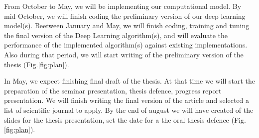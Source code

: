 \documentclass[12pt]{article}
\begin{document}
From October to May, we will be implementing our computational model. By mid October, we will finish coding the preliminary version of our deep learning model(s). Beetween January and May, we will finish coding, training and tuning the final version of the Deep Learning algorithm(s), and will evaluate the performance of the implemented algorithm(s) against existing implementations. Also during that period, we will start writing of the preliminary version of the thesis (Fig.\ref{fig:plan}).

In May, we expect finishing final draft of the thesis. At that time we will start the preparation of the seminar presentation, thesis defence, progress report presentation. We will finish writing the final version of the article and selected a list of scientific journal to apply. By the end of august we will have created of the slides for the thesis presentation, set the date for a the oral thesis defence (Fig.\ref{fig:plan}). 

\printbibliography[title={Bibliography},nottype=misc,resetnumbers=true]
\end{document}
